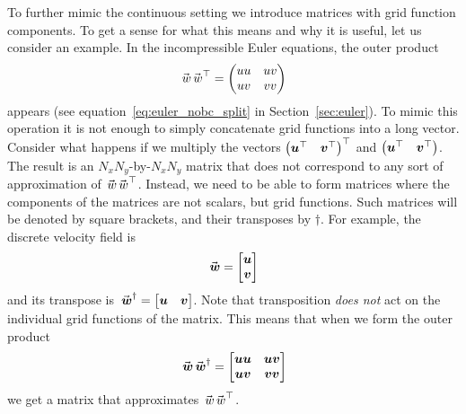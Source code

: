 To further mimic the continuous setting we introduce matrices with grid function components. To get a sense for what this means and why it is useful, let us consider an example. In the incompressible Euler equations, the outer product
\begin{equation*}
  \wc \wc^\top =
  \begin{pmatrix}
    uu & uv \\
    uv & vv
  \end{pmatrix}
\end{equation*}
appears (see equation~\eqref{eq:euler_nobc_split} in Section~\ref{sec:euler}). To mimic this operation it is not enough to simply concatenate grid functions into a long vector. Consider what happens if we multiply the vectors
$
\begin{pmatrix}
  \bm{u}^\top & \bm{v}^\top
\end{pmatrix}^\top
$
and
$
\begin{pmatrix}
  \bm{u}^\top & \bm{v}^\top
\end{pmatrix}
$. The result is an $N_x N_y$-by-$N_x N_y$ matrix that does not correspond to any sort of approximation of $\wc \wc^\top$. Instead, we need to be able to form matrices where the components of the matrices are not scalars, but grid functions. Such matrices will be denoted by square brackets, and their transposes by $\dagger$. For example, the discrete velocity field is
\begin{equation*}
  \wn =
  \begin{bmatrix}
    \un \\ \vn
  \end{bmatrix}
\end{equation*}
and its transpose is
$
\wn^\dagger =
\begin{bmatrix}
  \un & \vn
\end{bmatrix}
$. Note that transposition \emph{does not} act on the individual grid functions of the matrix. This means that when we form the outer product
\begin{equation*}
  \wn \wn^\dagger =
  \begin{bmatrix}
    \un \un & \un \vn \\
    \un \vn & \vn \vn
  \end{bmatrix}
\end{equation*}
we get a matrix that approximates $\wc \wc^\top$.

